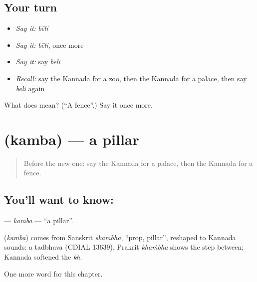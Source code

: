 \subsection*{Your turn}
\begin{itemize}
\raggedright
  \item \emph{Say it:} \emph{bēli}
  \item \emph{Say it:} \emph{bēli}, once more
  \item \emph{Say it:} say \emph{bēli}
  \item \emph{Recall:} say the Kannada for a zoo, then the Kannada for a palace, then say \emph{bēli} again
\end{itemize}

\begin{tcolorbox}[breakable,colback=teal!4,colframe=teal!35!black,title={Before you move on}]
What does  mean? (\textquotedblleft{}A fence\textquotedblright{}.) Say it once more.
\end{tcolorbox}
\section[\texorpdfstring{\kn{ಕಂಬ} (kamba)}{ಕಂಬ (kamba)}]{ (kamba) — a pillar}

\label{lesson:KA-C175-kamba}



\begin{quote}
Before the new one: say the Kannada for a palace, then the Kannada for a fence.
\end{quote}

\subsection*{You'll want to know: }
\textbf{} — \emph{kamba} — \textquotedblleft{}a pillar\textquotedblright{}.

\begin{cousinweb}
\textbf{} (\emph{kamba}) comes from Sanskrit \emph{skambha}, \textquotedblleft{}prop, pillar\textquotedblright{}, reshaped to Kannada sounds: a tadbhava (CDIAL 13639). Prakrit \emph{khaṁbha} shows the step between; Kannada softened the \emph{kh}.
\end{cousinweb}

\begin{grammarlens}[title={What you've built}]
One more word for this chapter.
\end{grammarlens}

